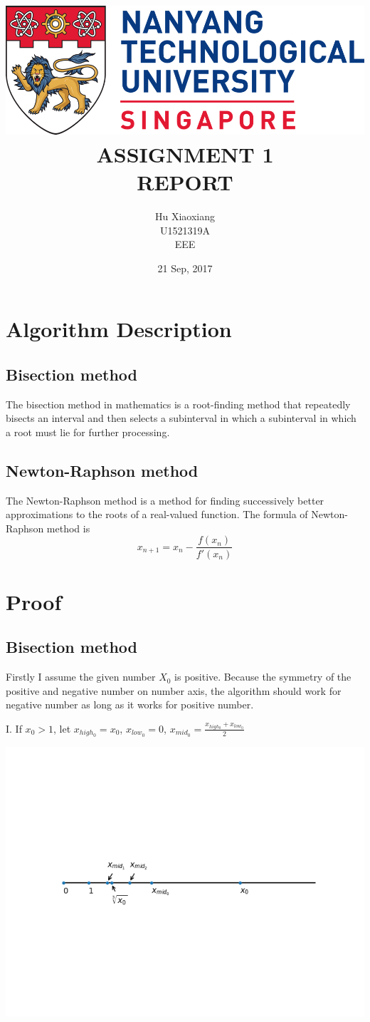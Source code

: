 \documentclass[titlepage]{article}
\author{Hu Xiaoxiang \\
U1521319A \\
EEE \\
}
\date{21 Sep, 2017 \\
}
\title{\includegraphics[width=\textwidth]{logo_ntu_new.png} \\
[5\baselineskip] ASSIGNMENT 1 \\
REPORT \\
[5\baselineskip]}
\begin{document}
\maketitle
\tableofcontents

\newpage
{}

\section{Algorithm Description}
\label{sec:org0a0f16f}
\subsection{Bisection method}
\label{sec:org14108ef}
The bisection method in mathematics is a root-finding method that repeatedly
bisects an interval and then selects a subinterval in which a subinterval
in which a root must lie for further processing.
\subsection{Newton-Raphson method}
\label{sec:orgb21c6d9}
The Newton-Raphson method is a method for finding successively better
approximations to the roots of a real-valued function. The formula of
Newton-Raphson method is $$x_{n+1} = x_n - \frac{f(x_n)}{f'(x_n)}$$

\section{Proof}
\label{sec:org782e96a}
\subsection{Bisection method}
\label{sec:orgdb1427f}
Firstly I assume the given number \(X_0\) is positive. Because the symmetry of
the positive and negative number on number axis, the algorithm should work
for negative number as long as it works for positive number.

I. If \(x_0 > 1\), let \(x_{high_0} = x_0\), \(x_{low_0} = 0\), \(x_{mid_0} = \frac{x_{high_0} + x_{low_0}}{2}\)
\begin{center}
\includegraphics[width=.9\linewidth]{numberAxis1.png}
\end{center}
\end{document}
